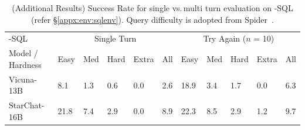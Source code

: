 \begin{table}[H]
\centering
\begin{tabular}{llllll|lllll}
\toprule
      \benchmark{}-SQL & \multicolumn{5}{c}{Single Turn} & \multicolumn{5}{c}{Try Again ($n$ = 10)} \\
     Model / Hardness & Easy & Med & Hard & Extra & All & Easy & Med & Hard & Extra & All \\
\midrule
Vicuna-13B & 8.1 & 1.3 & 0.6 & 0.0 & 2.6 & 18.9 & 3.4 & 1.7 & 0.0 & 6.3 \\
StarChat-16B & 21.8 & 7.4 & 2.9 & 0.0 & 8.9 & 22.3 & 8.5 & 2.9 & 1.2 & 9.7 \\
\bottomrule
\end{tabular}
\vspace{0.5em}
\caption{(Additional Results) Success Rate for single vs.\,multi turn evaluation on \benchmark{}-SQL (refer \S\ref{appx:env:sqlenv}). Query difficulty is adopted from Spider~\cite{yu-etal-2018-spider}.}
\label{table:single-vs-multi-sql-extra}
\vspace{-1.5em}
\end{table}